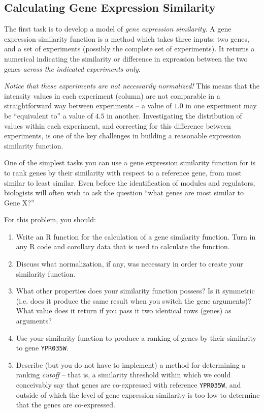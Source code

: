 \documentclass{article}
\newcommand{\gene}[1]{\texttt{#1}}
\begin{document}
\subsection{Calculating Gene Expression Similarity}

The first task is to develop a model of \emph{gene expression similarity}.  
A gene expression similarity function is a method which takes three inputs: two genes, and a set of experiments (possibly the complete set of experiments).  
It returns a numerical indicating the similarity or difference in expression between the two genes \emph{across the indicated experiments only}.  

\emph{Notice that these experiments are not necessarily normalized!} 
This means that the intensity values in each experiment (column) are not comparable in a straightforward way between experiments -- a value of $1.0$ in one experiment may be ``equivalent to'' a value of $4.5$ in another.  
Investigating the distribution of values within each experiment, and correcting for this difference between experiments, is one of the key challenges in building a reasonable expression similarity function.  

One of the simplest tasks you can use a gene expression similarity function for is to rank genes by their similarity with respect to a reference gene, from most similar to least similar.  
Even before the identification of modules and regulators, biologists will often wish to ask the question ``what genes are most similar to Gene X?''

For this problem, you should: 
\begin{enumerate}
\item Write an R function for the calculation of a gene similarity function.  Turn in any R code and corollary data that is used to calculate the function. 
\item Discuss what normalization, if any, was necessary in order to create your similarity function.  
\item What other properties does your similarity function possess?  Is it symmetric (i.e. does it produce the same result when you switch the gene arguments)?  What value does it return if you pass it two identical rows (genes) as arguments?  
\item Use your similarity function to produce a ranking of genes by their similarity to gene \gene{YPR035W}. 
\item Describe (but you do not have to implement) a method for determining a ranking \emph{cutoff} -- that is, a similarity threshold within which we could conceivably say that genes are co-expressed with reference \gene{YPR035W}, and outside of which the level of gene expression similarity is too low to determine that the genes are co-expressed. 
\end{enumerate}
\end{document}
